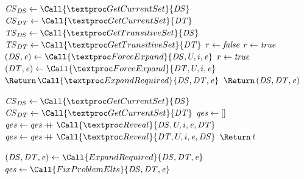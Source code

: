 \documentclass[acmsmall]{acmart}
\begin{document}
\paragraph*{\Expand}
\begin{algorithm}
  \caption{\Expand{}}
  \label{alg:synthlens}
  \begin{multicols}{2}
  \begin{algorithmic}[1]
    \State $\CurrentSet_{\DNFRegex} \gets \Call{\GetCurrentSet}{\DNFRegex}$
    \State $\CurrentSet_{\DNFRegexAlt} \gets \Call{\GetCurrentSet}{\DNFRegexAlt}$
    \State $\TransitiveSet_{\DNFRegex} \gets \Call{\GetTransitiveSet}{\DNFRegex}$
    \State $\TransitiveSet_{\DNFRegexAlt} \gets
    \Call{\GetTransitiveSet}{\DNFRegexAlt}$
    \State $r \gets \mathit{false}$
    \ForEach{$(\UserDef, \Int)$}{$\CurrentSet_{\DNFRegex} \setminus
      \TransitiveSet_{\DNFRegexAlt}$}
    \State $r \gets \mathit{true}$
    \State $(\DNFRegex,\ExpCount) \gets \Call{\ForceExpand}{\DNFRegex,\UserDef,\Int,\ExpCount}$
    \EndForEach
    \ForEach{$(\UserDef, \Int)$}{$\CurrentSet_{\DNFRegexAlt} \setminus
      \TransitiveSet_{\DNFRegex}$}
    \State $r \gets \mathit{true}$
    \State $(\DNFRegexAlt,\ExpCount) \gets \Call{\ForceExpand}{\DNFRegexAlt,\UserDef,\Int,\ExpCount}$
    \EndForEach
    \State $\ReturnVal{\Call{\ExpandRequired}{\DNFRegex,\DNFRegexAlt,\ExpCount}}$
    \EndIf
    \State $\ReturnVal{(\DNFRegex,\DNFRegexAlt,\ExpCount)}$
    \EndFunction

    \Statex
    
    \State $\CurrentSet_{\DNFRegex} \gets \Call{\GetCurrentSet}{\DNFRegex}$
    \State $\CurrentSet_{\DNFRegexAlt} \gets
    \Call{\GetCurrentSet}{\DNFRegexAlt}$
    \State $\mathit{qe}\mathit{s} \gets []$
      \ForEach{$(\UserDef, \Int)$}{$\CurrentSet_{\DNFRegexAlt} \setminus
      \CurrentSet_{\DNFRegex}$}
    \State $\QueueElements \gets \QueueElements \Append \Call{\Reveal}{\DNFRegex,\UserDef,\Int,\ExpCount,\DNFRegexAlt}$
    \EndForEach
    \ForEach{$(\UserDef, \Int)$}{$\CurrentSet_{\DNFRegex} \setminus
      \CurrentSet_{\DNFRegexAlt}$}
    \State $\QueueElements \gets \QueueElements \Append \Call{\Reveal}{\DNFRegexAlt,\UserDef,\Int,\ExpCount,\DNFRegex}$
    \EndForEach
    \State $\ReturnVal{\Types}$
    \EndFunction

    \Statex
    
    \State $(\DNFRegex,\DNFRegexAlt,\ExpCount) \gets
    \Call{ExpandRequired}{\DNFRegex,\DNFRegexAlt,\ExpCount}$
    \State $\QueueElements \gets
    \Call{FixProblemElts}{\DNFRegex,\DNFRegexAlt,\ExpCount}$
    \Switch{\QueueElements}
    \CaseTwo {[]}{$\ReturnVal{\Call{\ExpandOnce}{\DNFRegex,\DNFRegexAlt,\ExpCount}}$}
    \EndCaseTwo
    \CaseTwo {\_}{$\ReturnVal{\QueueElements}$}
    \EndCaseTwo
    \EndSwitch
    \EndFunction
  \end{algorithmic}
  \end{multicols}
\end{algorithm}
\end{document}
